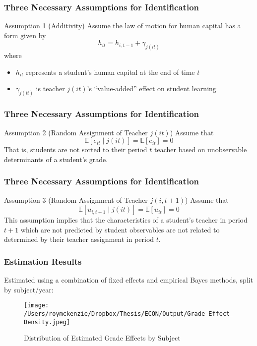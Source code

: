 \documentclass{beamer}
\begin{document}
\begin{frame}
\frametitle{Three Necessary Assumptions for Identification}
\begin{alertblock}{Assumption 1 (Additivity)}
Assume the law of motion for human capital has a form given by 
			\[
				h_{it} = h_{i,t-1} + \gamma_{j(it)} 
			\]
where 
\begin{itemize}
	\item $h_{it}$ represents a student's human capital at the end of time $t$
	\item $\gamma_{j(it)}$ is teacher $j(it)$'s ``value-added'' effect on student learning
\end{itemize}  
\end{alertblock}
\end{frame}

\begin{frame}
\frametitle{Three Necessary Assumptions for Identification}
\begin{alertblock}{Assumption 2 (Random Assignment of Teacher $j(it)$)}
Assume that 
		\[
			\mathbb{E}[e_{it} \mid j(it)] = \mathbb{E}[e_{it}] = 0 
		\]
That is, students are not sorted to their period $t$ teacher based on unobservable determinants of a student's grade.
\end{alertblock}
\end{frame}

\begin{frame}
\frametitle{Three Necessary Assumptions for Identification}
\begin{alertblock}{Assumption 3 (Random Assignment of Teacher $j(i,t+1)$)}
 Assume that 
		\[
			\mathbb{E}[u_{i,t+1} \mid j(it)] = \mathbb{E}[u_{it}] = 0
		\]
	This assumption implies that the characteristics of a student's teacher in period $t+1$ which are not predicted by student observables are not related to determined by their teacher assignment in period $t$.
\end{alertblock}
\end{frame}

\begin{frame}
\frametitle{Estimation Results}

Estimated using a combination of fixed effects and empirical Bayes methods, split by subject/year:

\begin{figure}[H]
	\centering
	\texttt{[image: /Users/roymckenzie/Dropbox/Thesis/ECON/Output/Grade\_Effect\_Density.jpeg]}
	\caption{Distribution of Estimated Grade Effects by Subject}
	\label{fig:ge_dist}
\end{figure}


\end{frame}
\end{document}
